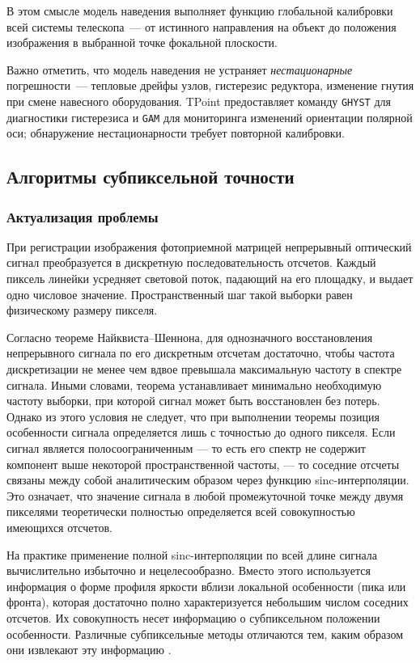 В этом смысле модель наведения выполняет функцию глобальной калибровки всей системы телескопа~--- от истинного направления на объект до положения изображения в выбранной точке фокальной плоскости.

Важно отметить, что модель наведения не устраняет \textit{нестационарные} погрешности~--- тепловые дрейфы узлов, гистерезис редуктора, изменение гнутия при смене навесного оборудования. TPoint предоставляет команду \texttt{GHYST} для диагностики гистерезиса и \texttt{GAM} для мониторинга изменений ориентации полярной оси; обнаружение нестационарности требует повторной калибровки.

\subsection{Алгоритмы субпиксельной точности}

\subsubsection{Актуализация проблемы}

При регистрации изображения фотоприемной матрицей непрерывный оптический сигнал преобразуется в дискретную последовательность отсчетов. Каждый пиксель линейки усредняет световой поток, падающий на его площадку, и выдает одно числовое значение. Пространственный шаг такой выборки равен физическому размеру пикселя.

Согласно теореме Найквиста–Шеннона, для однозначного восстановления непрерывного сигнала по его дискретным отсчетам достаточно, чтобы частота дискретизации не менее чем вдвое превышала максимальную частоту в спектре сигнала. Иными словами, теорема устанавливает минимально необходимую частоту выборки, при которой сигнал может быть восстановлен без потерь. Однако из этого условия не следует, что при выполнении теоремы позиция особенности сигнала определяется лишь с точностью до одного пикселя. Если сигнал является полосоограниченным — то есть его спектр не содержит компонент выше некоторой пространственной частоты, — то соседние отсчеты связаны между собой аналитическим образом через функцию sinc-интерполяции. Это означает, что значение сигнала в любой промежуточной точке между двумя пикселями теоретически полностью определяется всей совокупностью имеющихся отсчетов.

На практике применение полной sinc-интерполяции по всей длине сигнала вычислительно избыточно и нецелесообразно. Вместо этого используется информация о форме профиля яркости вблизи локальной особенности (пика или фронта), которая достаточно полно характеризуется небольшим числом соседних отсчетов. Их совокупность несет информацию о субпиксельном положении особенности. Различные субпиксельные методы отличаются тем, каким образом они извлекают эту информацию \cite{blais_rioux_peak}.

